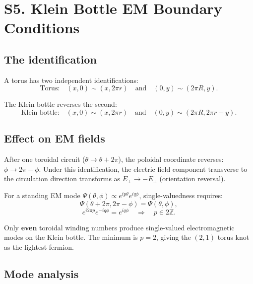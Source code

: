 \documentclass[11pt,a4paper]{article}
\begin{document}
\section{S5. Klein Bottle EM Boundary Conditions}
\label{sec:S5}

\subsection{The identification}

A torus has two independent identifications:
\begin{equation}
  \text{Torus:}\quad (x, 0) \sim (x, 2\pi r) \quad\text{and}\quad (0, y) \sim (2\pi R, y).
\end{equation}

The Klein bottle reverses the second:
\begin{equation}
  \text{Klein bottle:}\quad (x, 0) \sim (x, 2\pi r) \quad\text{and}\quad (0, y) \sim (2\pi R, 2\pi r - y).
\end{equation}

\subsection{Effect on EM fields}

After one toroidal circuit ($\theta \to \theta + 2\pi$), the poloidal coordinate reverses: $\phi \to 2\pi - \phi$. Under this identification, the electric field component transverse to the circulation direction transforms as $E_\perp \to -E_\perp$ (orientation reversal).

For a standing EM mode $\Psi(\theta, \phi) \propto e^{ip\theta}e^{iq\phi}$, single-valuedness requires:
\begin{equation}
  \Psi(\theta + 2\pi, 2\pi - \phi) = \Psi(\theta, \phi),
\end{equation}
\begin{equation}
  e^{i2\pi p}e^{-iq\phi} = e^{iq\phi} \quad \Rightarrow \quad p \in 2\mathbb{Z}.
\end{equation}

Only \textbf{even} toroidal winding numbers produce single-valued electromagnetic modes on the Klein bottle. The minimum is $p = 2$, giving the $(2,1)$ torus knot as the lightest fermion.

\subsection{Mode analysis}
\end{document}
